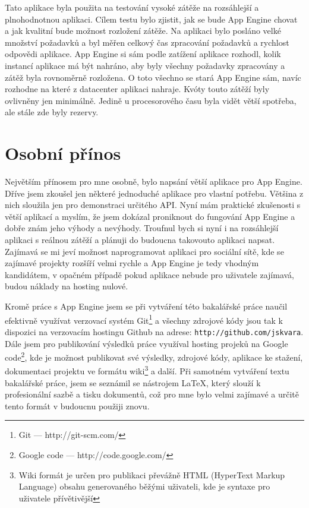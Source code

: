 Tato aplikace byla použita na testování vysoké zátěže na rozsáhlejší a plnohodnotnou aplikaci. Cílem testu bylo zjistit, jak se bude App Engine chovat a jak kvalitní bude možnost rozložení zátěže. Na aplikaci bylo posláno velké množství požadavků a byl měřen celkový čas zpracování požadavků a rychlost odpovědi aplikace.
App Engine si sám podle zatížení aplikace rozhodl, kolik instancí aplikace má být nahráno, aby byly všechny požadavky zpracovány a zátěž byla rovnoměrně rozložena. O toto všechno se stará App Engine sám, navíc rozhodne na které z datacenter aplikaci nahraje. Kvóty touto zátěží byly ovlivněny jen minimálně. Jedině u procesorového času byla vidět větší spotřeba, ale stále zde byly rezervy. 

\section{Osobní přínos}
Největším přínosem pro mne osobně, bylo napsání větší aplikace pro App Engine. Dříve jsem zkoušel jen některé jednoduché aplikace pro vlastní potřebu. Většina z nich sloužila jen pro demonstraci určitého API. Nyní mám praktické zkušenosti s větší aplikací a myslím, že jsem dokázal proniknout do fungování App Engine a dobře znám jeho výhody a nevýhody. Troufnul bych si nyní i na rozsáhlejší aplikaci s reálnou zátěží a plánuji do budoucna takovouto aplikaci napsat. Zajímavá se mi jeví možnost naprogramovat aplikaci pro sociální sítě, kde se zajímavé projekty rozšíří velmi rychle a App Engine je tedy vhodným kandidátem, v opačném případě pokud aplikace nebude pro uživatele zajímavá, budou náklady na hosting nulové.

Kromě práce s App Engine jsem se při vytváření této bakalářské práce naučil efektivně využívat verzovací systém Git\footnote{Git --- http://git-scm.com/} a všechny zdrojové kódy jsou tak k dispozici na verzovacím hostingu Github na adrese: \verb|http://github.com/jskvara|. Dále jsem pro publikování výsledků práce využíval hosting projeků na Google code\footnote{Google code --- http://code.google.com/}, kde je možnost publikovat své výsledky, zdrojové kódy, aplikace ke stažení, dokumentaci projektu ve formátu wiki\footnote{Wiki formát je určen pro publikaci převážně HTML (HyperText Markup Language) obsahu generovaného běžými uživateli, kde je syntaxe pro uživatele přívětivější} a další. Při samotném vytváření textu bakalářské práce, jsem se seznámil se nástrojem \LaTeX, který slouží k profesionální sazbě a tisku dokumentů, což pro mne bylo velmi zajímavé a určitě tento formát v budoucnu použiji znovu.